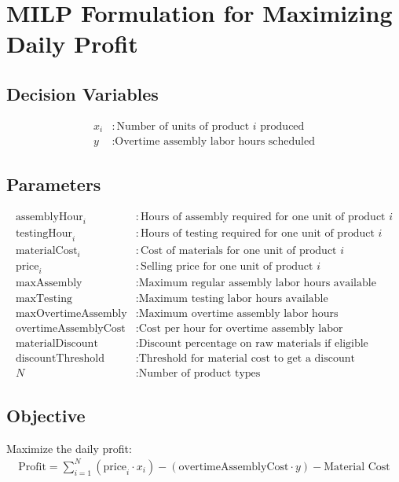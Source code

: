 \documentclass{article}
\begin{document}
\section*{MILP Formulation for Maximizing Daily Profit}

\subsection*{Decision Variables}
\begin{align*}
x_i & : \text{Number of units of product } i \text{ produced} \\
y & : \text{Overtime assembly labor hours scheduled}
\end{align*}

\subsection*{Parameters}
\begin{align*}
\text{assemblyHour}_i & : \text{Hours of assembly required for one unit of product } i \\
\text{testingHour}_i & : \text{Hours of testing required for one unit of product } i \\
\text{materialCost}_i & : \text{Cost of materials for one unit of product } i \\
\text{price}_i & : \text{Selling price for one unit of product } i \\
\text{maxAssembly} & : \text{Maximum regular assembly labor hours available} \\
\text{maxTesting} & : \text{Maximum testing labor hours available} \\
\text{maxOvertimeAssembly} & : \text{Maximum overtime assembly labor hours} \\
\text{overtimeAssemblyCost} & : \text{Cost per hour for overtime assembly labor} \\
\text{materialDiscount} & : \text{Discount percentage on raw materials if eligible} \\
\text{discountThreshold} & : \text{Threshold for material cost to get a discount} \\
N & : \text{Number of product types}
\end{align*}

\subsection*{Objective}
Maximize the daily profit:
\begin{align*}
\text{Profit} = \sum_{i=1}^{N} \left( \text{price}_i \cdot x_i \right) - \left( \text{overtimeAssemblyCost} \cdot y \right) - \text{Material Cost}
\end{align*}
\end{document}
